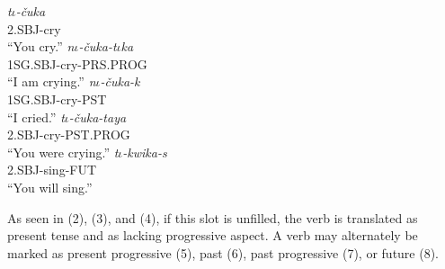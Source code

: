 \documentclass[doc,12pt]{apa6}
\begin{document}
\begin{exe}
	\ex \textit{t$\iota$-\v{c}uka} \\
		2.SBJ-cry \\
		``You cry.''
	\ex \textit{n$\iota$-\v{c}uka-t$\iota$ka} \\
		1SG.SBJ-cry-PRS.PROG \\
		``I am crying.''
	\ex \textit{n$\iota$-\v{c}uka-k} \\
		1SG.SBJ-cry-PST \\
		``I cried.''
	\ex \textit{t$\iota$-\v{c}uka-taya} \\
		2.SBJ-cry-PST.PROG \\
		``You were crying.''
	\ex \textit{t$\iota$-kwika-s} \\
		2.SBJ-sing-FUT \\
		``You will sing.''
\end{exe}

As seen in (2), (3), and (4), if this slot is unfilled, the verb is translated
as present tense and as lacking progressive aspect. A verb may alternately be
marked as present progressive (5), past (6), past progressive (7), or future
(8).
\end{document}
